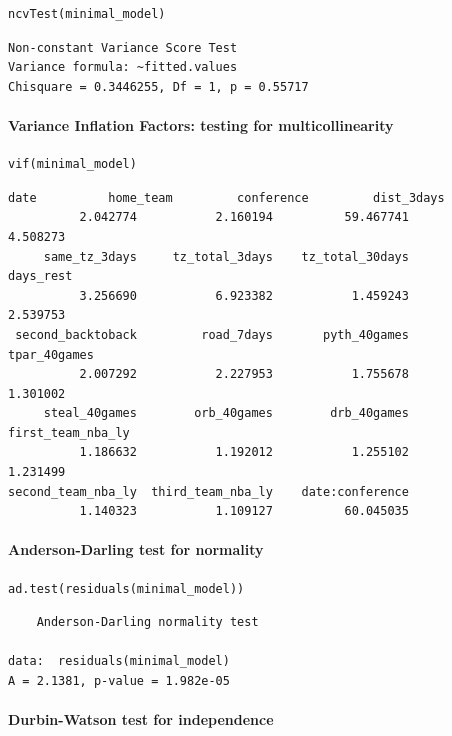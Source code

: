 \documentclass[
    12pt,
    a4paper,
    titlepage,  %
    abstract,  %
    headings=standardclasses,  %
    bibliography=totocnumbered  %
]{scrartcl}
\begin{document}
\begin{verbatim}
ncvTest(minimal_model)
\end{verbatim}

\begin{Verbatim}
Non-constant Variance Score Test 
Variance formula: ~fitted.values 
Chisquare = 0.3446255, Df = 1, p = 0.55717
\end{Verbatim}

\paragraph{Variance Inflation Factors: testing for multicollinearity}

\begin{verbatim}
vif(minimal_model)
\end{verbatim}

\begin{Verbatim}[fontsize=\small]
              date          home_team         conference         dist_3days 
          2.042774           2.160194          59.467741           4.508273 
     same_tz_3days     tz_total_3days    tz_total_30days          days_rest 
          3.256690           6.923382           1.459243           2.539753 
 second_backtoback         road_7days       pyth_40games       tpar_40games 
          2.007292           2.227953           1.755678           1.301002 
     steal_40games        orb_40games        drb_40games  first_team_nba_ly 
          1.186632           1.192012           1.255102           1.231499 
second_team_nba_ly  third_team_nba_ly    date:conference 
          1.140323           1.109127          60.045035 
\end{Verbatim}

\paragraph{Anderson-Darling test for normality}

\begin{verbatim}
ad.test(residuals(minimal_model))
\end{verbatim}

\begin{Verbatim}
    Anderson-Darling normality test

data:  residuals(minimal_model)
A = 2.1381, p-value = 1.982e-05
\end{Verbatim}

\paragraph{Durbin-Watson test for independence}
\end{document}
